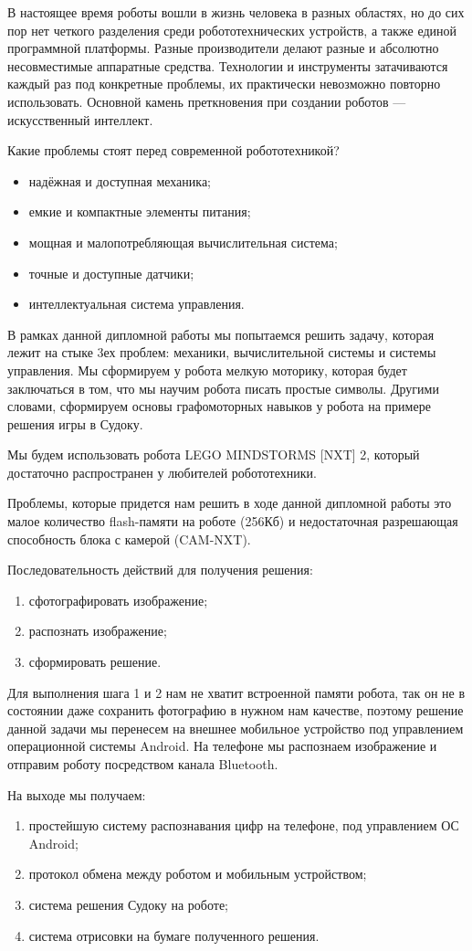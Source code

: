 \Introduction

В настоящее время роботы вошли в жизнь человека в разных областях, но до сих пор нет четкого разделения среди робототехнических устройств, а также единой программной платформы. Разные производители делают разные и абсолютно несовместимые аппаратные средства. Технологии и инструменты затачиваются каждый раз под конкретные проблемы, их практически невозможно повторно использовать. Основной камень преткновения при создании роботов — искусственный интеллект. 

Какие проблемы стоят перед современной робототехникой?

\begin{itemize}
\item надёжная и доступная механика;
\item емкие и компактные элементы питания;
\item мощная и малопотребляющая вычислительная система;
\item точные и доступные датчики;
\item интеллектуальная система управления.
\end{itemize}

В рамках данной дипломной работы мы попытаемся решить задачу, которая лежит на стыке 3ех проблем: механики, вычислительной системы и системы управления.
Мы сформируем у робота мелкую моторику, которая будет заключаться в том, что мы научим робота писать простые символы. Другими словами, сформируем основы графомоторных навыков у робота на примере решения игры в Судоку.

Мы будем использовать робота LEGO MINDSTORMS [NXT] 2, который достаточно распространен у любителей робототехники.

Проблемы, которые придется нам решить в ходе данной дипломной работы это малое количество flash-памяти на роботе (256Кб) и недостаточная разрешающая способность блока с камерой (CAM-NXT).

Последовательность действий для  получения решения:
\begin{enumerate}
\item сфотографировать изображение;
\item распознать изображение;
\item сформировать решение.
\end{enumerate}
Для выполнения шага 1 и 2 нам не хватит встроенной памяти робота, так он не в состоянии даже сохранить фотографию в нужном нам качестве, поэтому решение данной задачи мы перенесем на внешнее мобильное устройство под управлением операционной системы Android. На телефоне мы распознаем изображение и отправим роботу посредством канала Bluetooth.

На выходе мы получаем:
\begin{enumerate}
\item простейшую систему распознавания цифр на телефоне, под управлением ОС Android;
\item протокол обмена между роботом и мобильным устройством;
\item система решения Судоку на роботе;
\item система отрисовки на бумаге полученного решения.
\end{enumerate}